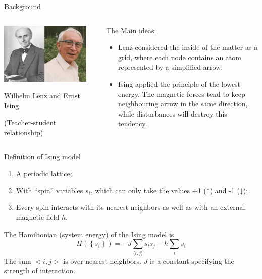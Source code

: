 \begin{frame}{Background}
	\begin{columns}
		\begin{column}{0.5\textwidth}
			\centerline{\includegraphics[width = 0.9\textwidth]{Figures/teacher.jpeg}}
			\centerline{Wilhelm Lenz and Ernst Ising}
			\centerline{(Teacher-student relationship)}
		\end{column}
		
		\begin{column}{0.5\textwidth}
			The Main ideas:
			\begin{itemize}
				\item Lenz considered the inside of the matter as a grid, where each node contains an atom represented by \alert{a simplified arrow}.
				\item Ising applied \alert{the principle of the lowest energy}. The magnetic forces tend to keep neighbouring arrow in the same direction, while disturbances will destroy this tendency.
			\end{itemize}
		\end{column}
	\end{columns}
\end{frame}

\begin{frame}{Definition of Ising model}
	\cite[pp.~74--75]{Ising model (1925)}
	\begin{definition}
		\begin{enumerate}
			\item A periodic lattice;
			\item With “spin” variables $s_i$, which can only take the values +1 (↑) and -1 (↓);
			\item Every spin interacts with its nearest neighbors as well as with an external magnetic field $h$.
		\end{enumerate}
		
	\end{definition}
	The Hamiltonian (system energy) of the Ising model is
	$$H\left(\left\{s_{i}\right\}\right)=-J \sum_{\langle i, j\rangle} s_{i} s_{j}-h \sum_{i} s_{i}$$
	The sum $<i,j>$ is over nearest neighbors. $J$ is a constant specifying the strength of interaction. 
\end{frame}

